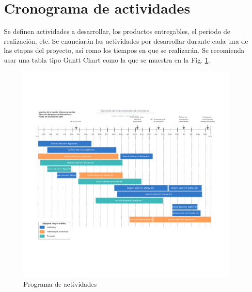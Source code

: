 \documentclass[letterpaper,12pt,oneside]{article}
\begin{document}
\section{Cronograma de actividades} 
Se definen actividades a desarrollar, los productos entregables, el periodo de realización, etc. Se enunciarán las actividades por desarrollar durante cada una de las etapas del proyecto, así como los tiempos en que se realizarán. Se recomienda usar una tabla tipo Gantt Chart como la que se muestra en la Fig. \ref{fig:cron}.

\begin{figure}[h]
    \centering
    \includegraphics[scale=0.4]{cronograma.png} %
    \caption{Programa de actividades}
    \label{fig:cron}
\end{figure}

\clearpage
\end{document}
